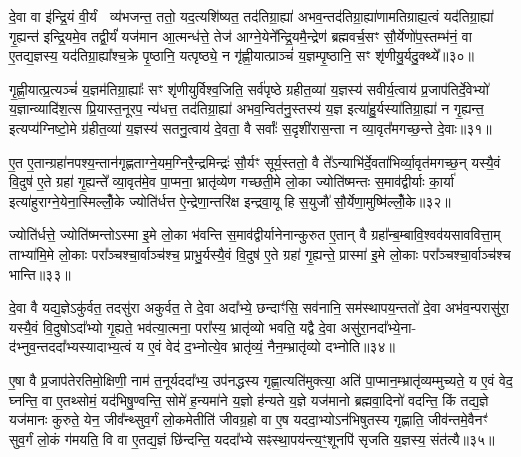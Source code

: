 {\anuvakamend[{अव॑ दाधार मि॒त्रेणै॒व प्री॑णाति॒ षट्च॑॥७॥}]}

दे॒वा वा इ॑न्द्रि॒यं वी॒र्यं  व्य॑भजन्त॒ ततो॒ यद॒त्यशि॑ष्यत॒ तद॑तिग्रा॒ह्या॑ अभव॒न्तद॑तिग्रा॒ह्या॑णामतिग्राह्य॒त्वं यद॑तिग्रा॒ह्या॑ गृ॒ह्यन्त॑ इन्द्रि॒यमे॒व तद्वी॒र्यं॑ यज॑मान आ॒त्मन्ध॑त्ते॒ तेज॑ आग्ने॒येने᳚न्द्रि॒यमै॒न्द्रेण॑ ब्रह्मवर्च॒सꣳ सौ॒र्येणो॑प॒स्तम्भ॑नं॒ वा ए॒तद्य॒ज्ञस्य॒ यद॑तिग्रा॒ह्या᳚श्च॒क्रे पृ॒ष्ठानि॒ यत्पृष्ठ्ये॒ न गृ॑ह्णी॒यात्प्राञ्चं॑ य॒ज्ञम्पृ॒ष्ठानि॒ सꣳ शृ॑णीयु॒र्यदु॒क्थ्ये᳚॥३०॥

गृ॒ह्णी॒यात्प्र॒त्यञ्चं॑ य॒ज्ञम॑तिग्रा॒ह्याः᳚ सꣳ शृ॑णीयुर्विश्व॒जिति॒ सर्व॑पृष्ठे ग्रहीत॒व्या॑ य॒ज्ञस्य॑ सवीर्य॒त्वाय॑ प्र॒जाप॑तिर्दे॒वेभ्यो॑ य॒ज्ञान्व्यादि॑श॒त्स प्रि॒यास्त॒नूरप॒ न्य॑धत्त॒ तद॑तिग्रा॒ह्या॑ अभव॒न्वित॑नु॒स्तस्य॑ य॒ज्ञ इत्या॑हु॒र्यस्या॑तिग्रा॒ह्या॑ न गृ॒ह्यन्त॒ इत्यप्य॑ग्निष्टो॒मे ग्र॑हीत॒व्या॑ य॒ज्ञस्य॑ सतनु॒त्वाय॑ दे॒वता॒ वै सर्वाः᳚ स॒दृशी॑रास॒न्ता न व्या॒वृत᳚मगच्छ॒न्ते दे॒वाः॥३१॥

ए॒त ए॒तान्ग्रहा॑नपश्य॒न्तान॑गृह्णताग्ने॒यम॒ग्निरै॒न्द्रमिन्द्रः॑ सौ॒र्यꣳ सूर्य॒स्ततो॒ वै ते᳚\-ऽन्याभि॑र्दे॒वता॑भिर्व्या॒वृत॑मगच्छ॒न् यस्यै॒वं वि॒दुष॑ ए॒ते ग्रहा॑ गृ॒ह्यन्ते᳚ व्या॒वृत॑मे॒व पा॒प्मना॒ भ्रातृ॑व्येण गच्छती॒मे लो॒का ज्योति॑ष्मन्तः स॒माव॑द्वीर्याः का॒र्या॑ इत्या॑हुराग्ने॒येना॒स्मिल्लोँ॒के ज्योति॑र्धत्त ऐ॒न्द्रेणा॒न्तरि॑क्ष इन्द्रवा॒यू हि स॒युजौ॑ सौ॒र्येणा॒मुष्मि॑ल्लोँ॒के॥३२॥

ज्योति॑र्धत्ते॒ ज्योति॑ष्मन्तो\-ऽस्मा इ॒मे लो॒का भ॑वन्ति स॒माव॑द्वीर्यानेनान्कुरुत ए॒तान् वै ग्रहा᳚न्ब॒म्बावि॒श्वव॑यसाववित्ता॒म् ताभ्या॑मि॒मे लो॒काः परा᳚ञ्चश्चा॒र्वाञ्च॑श्च॒ प्राभु॒र्यस्यै॒वं वि॒दुष॑ ए॒ते ग्रहा॑ गृ॒ह्यन्ते॒ प्रास्मा॑ इ॒मे लो॒काः परा᳚ञ्चश्चा॒र्वाञ्च॑श्च भान्ति॥३३॥

{\anuvakamend[{उ॒क्थ्ये॑ दे॒वा अ॒मुष्मि॑ल्लोँ॒क एका॒न्नच॑त्वारि॒ꣳ॒शच्च॑॥८॥}]}

दे॒वा वै यद्य॒ज्ञे\-ऽकु॑र्वत॒ तदसु॑रा अकुर्वत॒ ते दे॒वा अदा᳚भ्ये॒ छन्दाꣳ॑सि॒ सव॑नानि॒ सम॑स्थापय॒न्ततो॑ दे॒वा अभ॑व॒न्परासु॑रा॒ यस्यै॒वं वि॒दुषो\-ऽदा᳚भ्यो गृ॒ह्यते॒ भव॑त्या॒त्मना॒ परा᳚स्य॒ भ्रातृ॑व्यो भवति॒ यद्वै दे॒वा असु॑रा॒नदा᳚भ्ये॒ना- द॑भ्नुव॒न्तददा᳚भ्यस्यादाभ्य॒त्वं य ए॒वं वेद॑ द॒भ्नोत्ये॒व भ्रातृ॑व्यं॒ नैन॒म्भ्रातृ॑व्यो दभ्नोति॥३४॥

ए॒षा वै प्र॒जाप॑तेरतिमो॒क्षिणी॒ नाम॑ त॒नूर्यददा᳚भ्य॒ उप॑नद्धस्य गृह्णा॒त्यति॑मुक्त्या॒ अति॑ पा॒प्मान॒म्भ्रातृ॑व्यम्मुच्यते॒ य ए॒वं वेद॒ घ्नन्ति॒ वा ए॒तथ्सोमं॒ यद॑भिषु॒ण्वन्ति॒ सोमे॑ ह॒न्यमा॑ने य॒ज्ञो ह॑न्यते य॒ज्ञे यज॑मानो ब्रह्मवा॒दिनो॑ वदन्ति॒ किं तद्य॒ज्ञे यज॑मानः कुरुते॒ येन॒ जीव᳚न्थ्सुव॒र्गं लो॒कमेतीति॑ जीवग्र॒हो वा ए॒ष यददा॒भ्यो\-ऽन॑भिषुतस्य गृह्णाति॒ जीव॑न्तमे॒वैनꣳ॑ सुव॒र्गं लो॒कं ग॑मयति॒ वि वा ए॒तद्य॒ज्ञं छि॑न्दन्ति॒ यददा᳚भ्ये सꣴस्था॒पय॑न्त्य॒ꣳ॒शूनपि॑ सृजति य॒ज्ञस्य॒ संत॑त्यै॥३५॥

